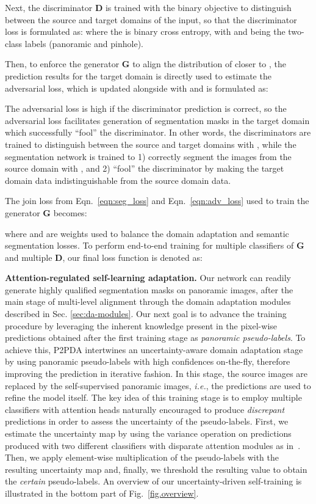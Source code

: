 \documentclass[journal]{IEEEtran}
\begin{document}
Next, the discriminator \textbf{D} is trained with the binary objective to distinguish between the source and target domains of the input, so that the discriminator loss is formulated as:
\label{eqn:d_loss}
where the  is binary cross entropy, with  and  being the two-class labels (panoramic and pinhole).

Then, to enforce the generator \textbf{G} to align the distribution of  closer to , the prediction results  for the target domain is directly used to estimate the adversarial loss, which is updated alongside with  and is formulated as:
 
The adversarial loss is high if the discriminator prediction is correct, 
so the adversarial loss facilitates generation of segmentation masks in the target domain which successfully ``fool'' the discriminator.
In other words, the discriminators are trained to distinguish between the source and target domains with , while the segmentation network  is trained to 1) correctly segment the images from the source domain with , and 2) ``fool'' the discriminator by making the target domain data indistinguishable from the source domain data.

The join loss from Eqn.~\eqref{eqn:seg_loss} and Eqn.~\eqref{eqn:adv_loss} used to train the generator \textbf{G} becomes:

where  and  are weights used to balance the domain adaptation and semantic segmentation losses. To perform end-to-end training for multiple classifiers of \textbf{G} and multiple \textbf{D}, our final loss function is denoted as:


\textbf{Attention-regulated self-learning adaptation.}
Our network can readily generate highly qualified segmentation masks on panoramic images, after the main stage of multi-level alignment through the domain adaptation modules described in Sec. \ref{sec:da-modules}.
Our next goal is to advance the training procedure by leveraging the inherent knowledge present in the pixel-wise predictions obtained after the first training stage as \emph{panoramic pseudo-labels}.
To achieve this, P2PDA intertwines an uncertainty-aware domain adaptation stage by using panoramic pseudo-labels with high confidences on-the-fly, therefore improving the prediction in iterative fashion.
In this stage, the source images are replaced by the self-supervised panoramic images, \textit{i.e.}, the predictions are used to refine the model itself.
The key idea of this training stage is to employ multiple classifiers with attention heads naturally encouraged to produce \emph{discrepant} predictions in order to assess the uncertainty of the pseudo-labels.
First, we estimate the uncertainty map by using  the variance operation on predictions produced with two different classifiers with disparate attention modules as in~\cite{danet,ranet}. 
Then, we apply element-wise multiplication of the pseudo-labels with the resulting uncertainty map and, finally, we threshold the resulting value to obtain the \emph{certain} pseudo-labels.
An overview of our uncertainty-driven self-training is illustrated in the bottom part of Fig.~\ref{fig.overview}.
\end{document}
